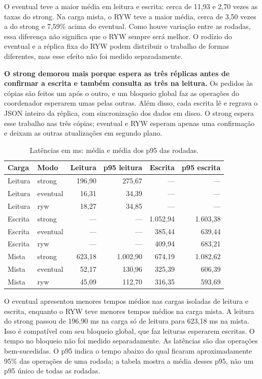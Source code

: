 O eventual teve a maior média em leitura e escrita: cerca de 11,93 e
2,70 vezes as taxas do strong. Na carga mista, o RYW teve a maior média,
cerca de 3,50 vezes a do strong e 7,59\% acima do eventual. Como houve
variação entre as rodadas, essa diferença não significa que o RYW sempre
será melhor. O rodízio do eventual e a réplica fixa do RYW podem distribuir
o trabalho de formas diferentes, mas esse efeito não foi medido separadamente.

\textbf{O strong demorou mais porque espera as três réplicas antes de confirmar
a escrita e também consulta as três na leitura.} Os pedidos às cópias são
feitos um após o outro, e um bloqueio global faz as operações do coordenador
esperarem umas pelas outras. Além disso, cada escrita lê e regrava o JSON
inteiro da réplica, com sincronização dos dados em disco. O strong espera
esse trabalho nas três cópias; eventual e RYW esperam apenas uma confirmação
e deixam as outras atualizações em segundo plano.

\begin{table}[!ht]
\centering\small\setlength{\tabcolsep}{5pt}
\caption{Latências em ms: média e média dos p95 das rodadas.}
\begin{tabular}{llrrrr}
\toprule
Carga & Modo & Leitura & p95 leitura & Escrita & p95 escrita\\\midrule
Leitura & strong & 196,90 & 275,67 & --- & ---\\
Leitura & eventual & 16,31 & 34,39 & --- & ---\\
Leitura & ryw & 18,27 & 34,85 & --- & ---\\
Escrita & strong & --- & --- & 1.052,94 & 1.603,38\\
Escrita & eventual & --- & --- & 385,44 & 639,44\\
Escrita & ryw & --- & --- & 409,94 & 683,21\\
Mista & strong & 623,18 & 1.002,90 & 674,19 & 1.082,62\\
Mista & eventual & 52,17 & 130,96 & 325,39 & 606,39\\
Mista & ryw & 45,09 & 112,70 & 316,35 & 593,69\\
\bottomrule\end{tabular}
\end{table}

O eventual apresentou menores tempos médios nas cargas isoladas de leitura
e escrita, enquanto o RYW teve menores tempos médios na carga mista.
A leitura do strong passou de 196,90 ms na carga só de leitura para
623,18 ms na mista. Isso é compatível com seu bloqueio global, que faz
leituras esperarem escritas. O tempo no bloqueio não foi medido separadamente.
As latências são das operações bem-sucedidas. O p95 indica o tempo abaixo
do qual ficaram aproximadamente 95\% das operações de uma rodada; a tabela
mostra a média desses p95, não um p95 único de todas as rodadas.

